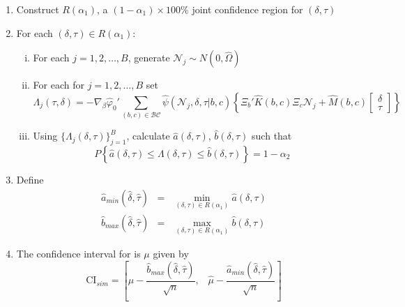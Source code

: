 \begin{alg}
\label{alg:conf}
\mbox{}
\begin{enumerate}
	\item Construct $ R(\alpha_1)$, a $(1-\alpha_1)\times 100\%$ joint confidence region for $(\delta,\tau)$ 
	\item For each $(\delta,\tau)\in R(\alpha_1)$:
		\begin{enumerate}[(i)]
			\item For each $j = 1, 2, \hdots, B$, generate $\mathscr{N}_j \sim N(0, \widehat{\Omega})$
			\item For each for $j = 1, 2, \hdots, B$ set $$\Lambda_j(\tau,\delta)= -\nabla_\beta\widehat{\varphi}_0' \sum_{(b,c) \in \mathcal{BC}} \widehat{\psi}(\mathscr{N}_j,\delta, \tau|b,c) \left\{\Xi_b' \widehat{K}(b,c) \Xi_c \mathscr{N}_j + \widehat{M}(b,c)  \left[\begin{array}{c}\delta \\ \tau \end{array} \right]\right\}$$
			\item Using $\{\Lambda_j(\delta, \tau)\}_{j=1}^B$, calculate $\widehat{a}(\delta,\tau)$, $\widehat{b}(\delta, \tau)$ such that
		$$P\left\{ \widehat{a}(\delta,\tau) \leq\Lambda(\delta,\tau)\leq \widehat{b}(\delta,\tau) \right\} = 1 - \alpha_2$$
		\end{enumerate}
	\item Define
			\begin{eqnarray*}
				\widehat{a}_{min}(\widehat{\delta}, \widehat{\tau})&=& \min_{(\delta,\tau) \in R(\alpha_1)} \widehat{a}(\delta,\tau)\\
				\widehat{b}_{max}(\widehat{\delta}, \widehat{\tau})&=& \max_{(\delta,\tau) \in R(\alpha_1)}\widehat{b}(\delta,\tau)
			\end{eqnarray*}
	\item The confidence interval for is $\mu$ given by
				$$\mbox{CI}_{sim}=\left[ \widehat{\mu} - \frac{\widehat{b}_{max}(\widehat{\delta}, \widehat{\tau})}{\sqrt{n}}, \;\;\; \widehat{\mu} - \frac{\widehat{a}_{min}(\widehat{\delta}, \widehat{\tau})}{\sqrt{n}} \right]$$
\end{enumerate}
\end{alg}

